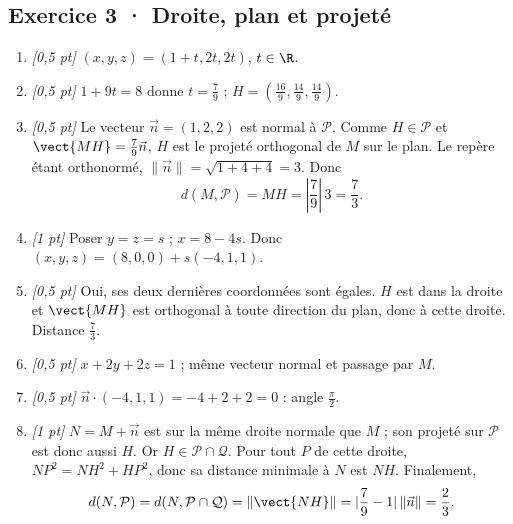 \subsection*{Exercice 3 · Droite, plan et projeté}\begin{enumerate}

\item \textit{[0,5 pt]} $(x,y,z)=(1+t,2t,2t)$, $t\in\R$.

\item \textit{[0,5 pt]} $1+9t=8$ donne $t=\frac{7}{9}$ ; $H=(\frac{16}{9},\frac{14}{9},\frac{14}{9})$.

\item \textit{[0,5 pt]} Le vecteur $\vec n=(1,2,2)$ est normal à $\mathcal P$. Comme $H\in\mathcal P$ et $\vect{MH}=\frac{7}{9}\vec n$, $H$ est le projeté orthogonal de $M$ sur le plan. Le repère étant orthonormé, $\|\vec n\|=\sqrt{1+4+4}=3$. Donc
\[d(M,\mathcal P)=MH=|\frac{7}{9}|\,3=\frac{7}{3}.\]

\item \textit{[1 pt]} Poser $y=z=s$ ; $x=8-4s$. Donc $(x,y,z)=(8,0,0)+s(-4,1,1)$.

\item \textit{[0,5 pt]} Oui, ses deux dernières coordonnées sont égales. $H$ est dans la droite et $\vect{MH}$ est orthogonal à toute direction du plan, donc à cette droite. Distance $\frac{7}{3}$.

\item \textit{[0,5 pt]} $x+2y+2z=1$ ; même vecteur normal et passage par $M$.

\item \textit{[0,5 pt]} $\vec n\cdot(-4,1,1)=-4+2+2=0$ : angle $\frac{\pi}{2}$.

\item \textit{[1 pt]} $N=M+\vec n$ est sur la même droite normale que $M$ ; son projeté sur $\mathcal P$ est donc aussi $H$. Or $H\in\mathcal P\cap\mathcal Q$. Pour tout $P$ de cette droite, $NP^2=NH^2+HP^2$, donc sa distance minimale à $N$ est $NH$. Finalement,
\[d(N,\mathcal P)=d(N,\mathcal P\cap\mathcal Q)=\|\vect{NH}\|=|\frac{7}{9}-1|\,\|\vec n\|=\frac{2}{3}.\]

\end{enumerate}

